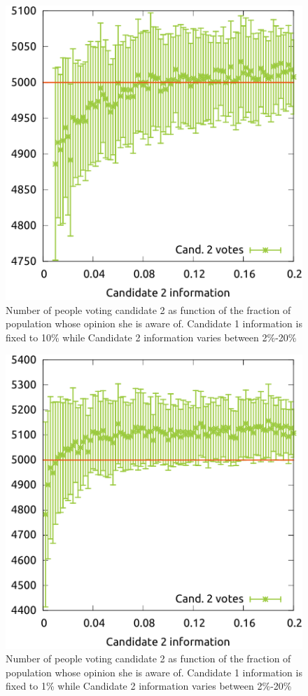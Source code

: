 \documentclass[11pt,a4paper,twocolumn]{article}
\begin{document}
\begin{figure}
\includegraphics[scale=1]{pictures/voter_1-crop.pdf}
\caption{Number of people voting candidate 2 as function of the fraction of population whose opinion she is aware of. Candidate 1 information is fixed to 10\% while Candidate 2 information varies between 2\%-20\%}
\label{fig:voter_1}
\end{figure}

\begin{figure}
\includegraphics[scale=1]{pictures/voter_01-crop.pdf}
\caption{Number of people voting candidate 2 as function of the fraction of population whose opinion she is aware of. Candidate 1 information is fixed to 1\% while Candidate 2 information varies between 2\%-20\%}\label{fig:voter_01}
\end{figure}
\end{document}
